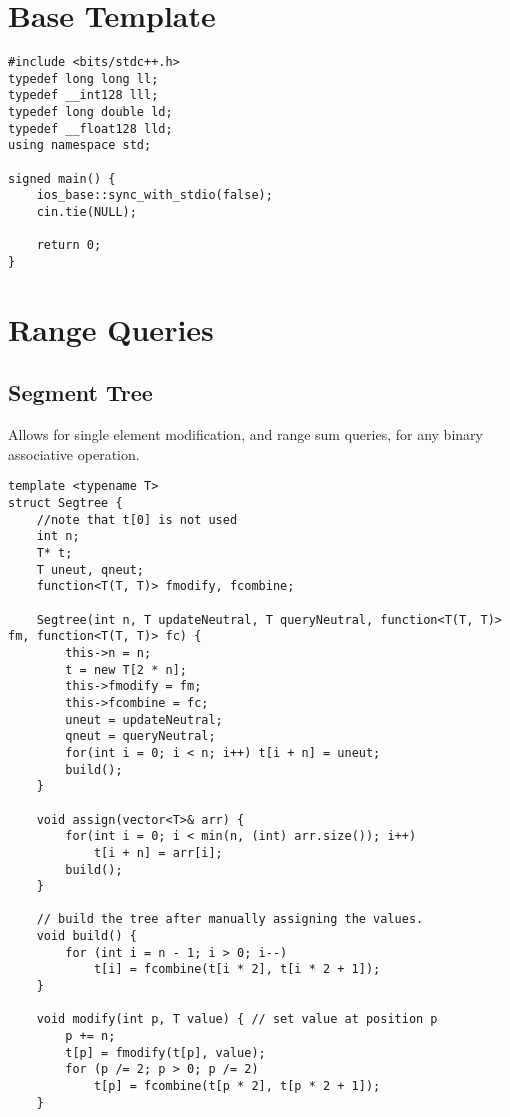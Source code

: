 \documentclass[8pt, headheight=10pt, a4paper]{article}
\title{\scalebox{2}{\fontsize{32pt}{0pt}\selectfont \textbf{hyper}}}
\author{\scalebox{1}{\fontsize{16pt}{0pt}\selectfont {Andwerp, dmot, Duckling}}}
\affil{\scalebox{1}{\fontsize{12pt}{0pt}\selectfont {Texas A\&M University}}}
\begin{document}
\begin{titlingpage}
\maketitle
\end{titlingpage}
\pagebreak

\begin{multicols*}{3}
\section{Base Template}
\begin{lstlisting}
#include <bits/stdc++.h>
typedef long long ll;
typedef __int128 lll;
typedef long double ld;
typedef __float128 lld;
using namespace std;

signed main() {
    ios_base::sync_with_stdio(false);
    cin.tie(NULL);
    
    return 0;
}
\end{lstlisting}

\section{Range Queries}
\subsection{Segment Tree}
Allows for single element modification, and range sum queries, for any binary associative operation. 
\begin{lstlisting}
template <typename T>
struct Segtree {
    //note that t[0] is not used
    int n;
    T* t;
    T uneut, qneut;
    function<T(T, T)> fmodify, fcombine;

    Segtree(int n, T updateNeutral, T queryNeutral, function<T(T, T)> fm, function<T(T, T)> fc) {
        this->n = n;
        t = new T[2 * n];
        this->fmodify = fm;
        this->fcombine = fc;
        uneut = updateNeutral;
        qneut = queryNeutral;
        for(int i = 0; i < n; i++) t[i + n] = uneut;
        build();
    }

    void assign(vector<T>& arr) {
        for(int i = 0; i < min(n, (int) arr.size()); i++)
            t[i + n] = arr[i];
        build();
    }

	// build the tree after manually assigning the values.
    void build() { 
        for (int i = n - 1; i > 0; i--)
            t[i] = fcombine(t[i * 2], t[i * 2 + 1]);
    }

    void modify(int p, T value) { // set value at position p
        p += n;
        t[p] = fmodify(t[p], value);
        for (p /= 2; p > 0; p /= 2)
            t[p] = fcombine(t[p * 2], t[p * 2 + 1]);
    }


\end{lstlisting}
\end{multicols*}
\end{document}
